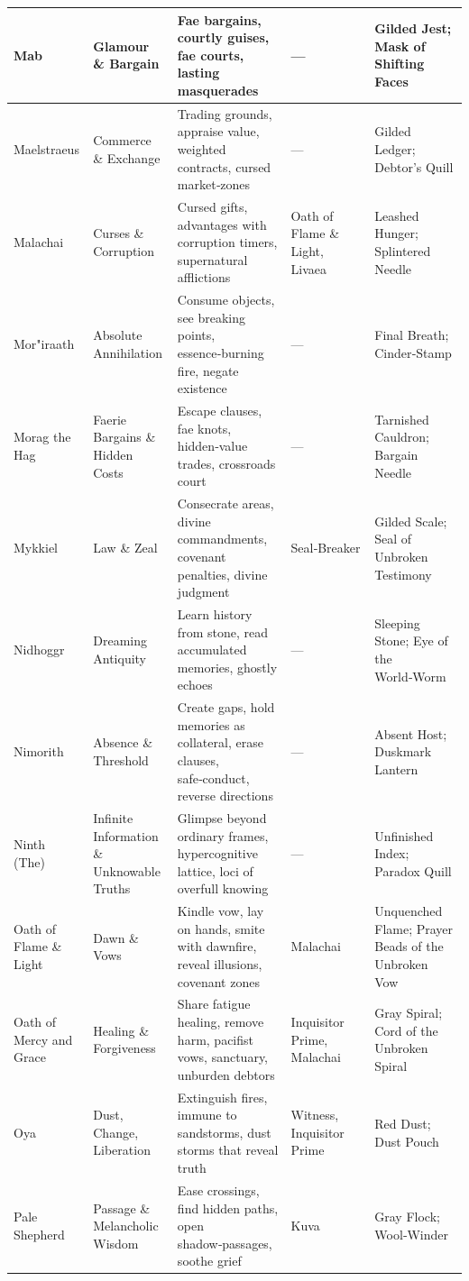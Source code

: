 \begin{center}
\begin{longtable}{p{2.2cm}p{2.5cm}p{3.5cm}p{1.6cm}p{3.2cm}}
\hline
Mab & Glamour \& Bargain & Fae bargains, courtly guises, fae courts, lasting masquerades & --- & Gilded Jest; Mask of Shifting Faces \\
\hline
Maelstraeus & Commerce \& Exchange & Trading grounds, appraise value, weighted contracts, cursed market‑zones & --- & Gilded Ledger; Debtor's Quill \\
\hline
Malachai & Curses \& Corruption & Cursed gifts, advantages with corruption timers, supernatural afflictions & Oath of Flame \& Light, Livaea & Leashed Hunger; Splintered Needle \\
\hline
Mor"iraath & Absolute Annihilation & Consume objects, see breaking points, essence‑burning fire, negate existence & --- & Final Breath; Cinder‑Stamp \\
\hline
Morag the Hag & Faerie Bargains \& Hidden Costs & Escape clauses, fae knots, hidden‑value trades, crossroads court & --- & Tarnished Cauldron; Bargain Needle \\
\hline
Mykkiel & Law \& Zeal & Consecrate areas, divine commandments, covenant penalties, divine judgment & Seal‑Breaker & Gilded Scale; Seal of Unbroken Testimony \\
\hline
Nidhoggr & Dreaming Antiquity & Learn history from stone, read accumulated memories, ghostly echoes & --- & Sleeping Stone; Eye of the World‑Worm \\
\hline
Nimorith & Absence \& Threshold & Create gaps, hold memories as collateral, erase clauses, safe‑conduct, reverse directions & --- & Absent Host; Duskmark Lantern \\
\hline
Ninth (The) & Infinite Information \& Unknowable Truths & Glimpse beyond ordinary frames, hypercognitive lattice, loci of overfull knowing & --- & Unfinished Index; Paradox Quill \\
\hline
Oath of Flame \& Light & Dawn \& Vows & Kindle vow, lay on hands, smite with dawnfire, reveal illusions, covenant zones & Malachai & Unquenched Flame; Prayer Beads of the Unbroken Vow \\
\hline
Oath of Mercy and Grace & Healing \& Forgiveness & Share fatigue healing, remove harm, pacifist vows, sanctuary, unburden debtors & Inquisitor Prime, Malachai & Gray Spiral; Cord of the Unbroken Spiral \\
\hline
Oya & Dust, Change, Liberation & Extinguish fires, immune to sandstorms, dust storms that reveal truth & Witness, Inquisitor Prime & Red Dust; Dust Pouch \\
\hline
Pale Shepherd & Passage \& Melancholic Wisdom & Ease crossings, find hidden paths, open shadow‑passages, soothe grief & Kuva & Gray Flock; Wool‑Winder \\

\end{longtable}
\end{center}
